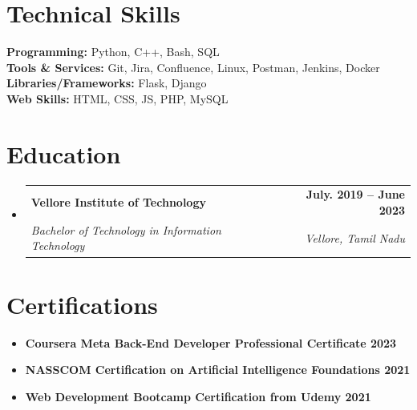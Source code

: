 \documentclass[letterpaper,11pt]{article}
\makeatletter
\newcommand{\resumeSubheading}[4]{
  \vspace{-2pt}\item
    \begin{tabular*}{1.0\textwidth}[t]{l@{\extracolsep{\fill}}r}
      \textbf{#1} & \textbf{\small #2} \\
      \textit{\small#3} & \textit{\small #4} \\
    \end{tabular*}\vspace{-7pt}
}
\newcommand{\resumeSubHeadingListStart}{\begin{itemize}[leftmargin=0.0in, label={}]}
\newcommand{\resumeSubHeadingListEnd}{\end{itemize}}
\makeatother
\begin{document}
\section{Technical Skills}
 \begin{itemize}[leftmargin=0.15in, label={}]
    \small{\item{
     \textbf{Programming:} {Python, C++, Bash, SQL} \\
     \textbf{Tools \& Services:} {Git, Jira, Confluence, Linux, Postman, Jenkins, Docker} \\
     \textbf{Libraries/Frameworks:} {Flask, Django} \\
     \textbf{Web Skills:} {HTML, CSS, JS, PHP, MySQL} \\
    }}
 \end{itemize}
 \vspace{-16pt}
\section{Education}
  \resumeSubHeadingListStart
    \resumeSubheading
      {Vellore Institute of Technology}{July. 2019 -- June 2023}
      {Bachelor of Technology in Information Technology}{Vellore, Tamil Nadu}
  \resumeSubHeadingListEnd

\section{Certifications}
\resumeSubHeadingListStart
\begin{itemize}
\item \textbf{Coursera Meta Back-End Developer Professional Certificate 2023}
\item \textbf{NASSCOM Certification on Artificial Intelligence Foundations 2021}
\item \textbf{Web Development Bootcamp Certification from Udemy 2021}
\end{itemize}
\resumeSubHeadingListEnd
\end{document}
